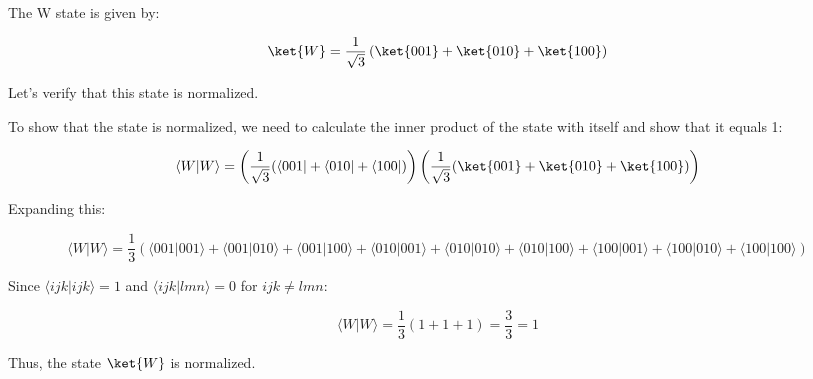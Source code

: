 \documentclass{article}
\begin{document}
The W state is given by:

\[
\ket{W} = \frac{1}{\sqrt{3}} \left( \ket{001} + \ket{010} + \ket{100} \right)
\]

Let's verify that this state is normalized.

To show that the state is normalized, we need to calculate the inner product of the state with itself and show that it equals 1:

\[
\langle W | W \rangle = \left( \frac{1}{\sqrt{3}} (\langle 001 | + \langle 010 | + \langle 100 |) \right) \left( \frac{1}{\sqrt{3}} (\ket{001} + \ket{010} + \ket{100}) \right)
\]

Expanding this:

\[
\langle W | W \rangle = \frac{1}{3} \left( \langle 001 | 001 \rangle + \langle 001 | 010 \rangle + \langle 001 | 100 \rangle + \langle 010 | 001 \rangle + \langle 010 | 010 \rangle + \langle 010 | 100 \rangle + \langle 100 | 001 \rangle + \langle 100 | 010 \rangle + \langle 100 | 100 \rangle \right)
\]

Since \(\langle ijk | ijk \rangle = 1\) and \(\langle ijk | lmn \rangle = 0\) for \(ijk \ne lmn\):

\[
\langle W | W \rangle = \frac{1}{3} \left( 1 + 1 + 1 \right) = \frac{3}{3} = 1
\]

Thus, the state \(\ket{W}\) is normalized.
\end{document}
